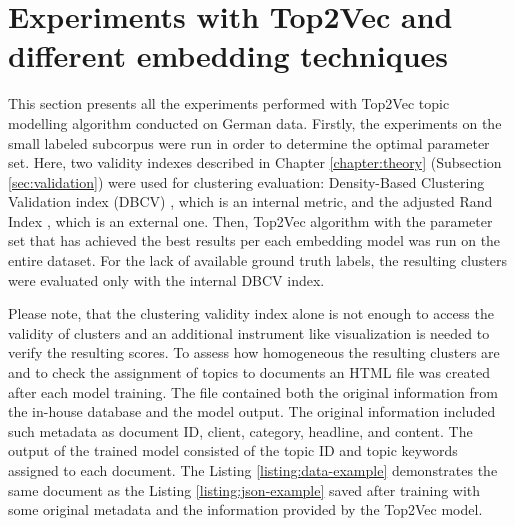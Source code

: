\documentclass[fontsize=12pt,a4paper,twoside,openany]{scrbook}
\begin{document}
\section{Experiments with Top2Vec and different embedding techniques}
\label{sec:exp}

This section presents all the experiments performed with Top2Vec topic modelling algorithm conducted on German data. Firstly, the experiments on the small labeled subcorpus were run in order to determine the optimal parameter set. Here, two validity indexes described in Chapter \ref{chapter:theory} (Subsection \ref{sec:validation}) were used for clustering evaluation: Density-Based Clustering Validation index (DBCV) \parencite{Moulavi14}, which is an internal metric, and the adjusted Rand Index \parencite{Hubert85}, which is an external one. Then, Top2Vec algorithm with the parameter set that has achieved the best results per each embedding model was run on the entire dataset. For the lack of available ground truth labels, the resulting clusters were evaluated only with the internal DBCV index.

Please note, that the clustering validity index alone is not enough to access the validity of clusters and an additional instrument like visualization is needed \parencite{Halkidi01b} to verify the resulting scores. To assess how homogeneous the resulting clusters are and to check the assignment of topics to documents an HTML file was created after each model training. The file contained both the original information from the in-house database and the model output. The original information included such metadata as document ID, client, category, headline, and content. The output of the trained model consisted of the topic ID and topic keywords assigned to each document. The Listing \ref{listing:data-example} demonstrates the same document as the Listing \ref{listing:json-example} saved after training with some original metadata and the information provided by the Top2Vec model.
\end{document}
